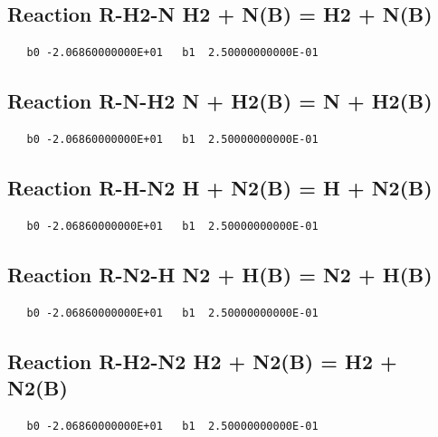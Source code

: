 \documentclass[12pt]{article}
\begin{document}
\subsection{
Reaction R-H2-N H2 + N(B) = H2 + N(B) }
\begin{small}\begin{verbatim}
   b0 -2.06860000000E+01   b1  2.50000000000E-01
\end{verbatim}\end{small}
\newpage

\subsection{
Reaction R-N-H2 N + H2(B) = N + H2(B) }
\begin{small}\begin{verbatim}
   b0 -2.06860000000E+01   b1  2.50000000000E-01
\end{verbatim}\end{small}
\newpage

\subsection{
Reaction R-H-N2 H + N2(B) = H + N2(B) }
\begin{small}\begin{verbatim}
   b0 -2.06860000000E+01   b1  2.50000000000E-01
\end{verbatim}\end{small}
\newpage

\subsection{
Reaction R-N2-H N2 + H(B) = N2 + H(B) }
\begin{small}\begin{verbatim}
   b0 -2.06860000000E+01   b1  2.50000000000E-01
\end{verbatim}\end{small}
\newpage

\subsection{
Reaction R-H2-N2 H2 + N2(B) = H2 + N2(B) }
\begin{small}\begin{verbatim}
   b0 -2.06860000000E+01   b1  2.50000000000E-01
\end{verbatim}\end{small}
\newpage
\end{document}
